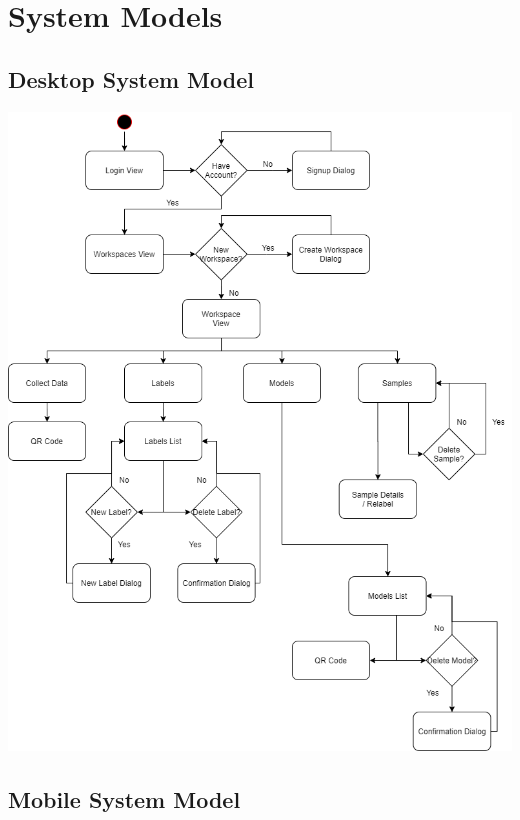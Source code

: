 \section{System Models}
\subsection{Desktop System Model}
\begin{center}
    \includegraphics[width=\textwidth,height=0.85\textheight,keepaspectratio]{charts/flow1.png}
\end{center}
\subsection{Mobile System Model}
